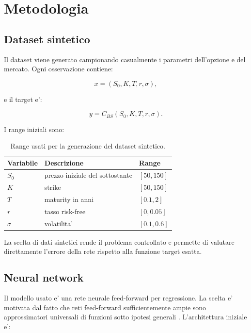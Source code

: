 \section{Metodologia}

\subsection{Dataset sintetico}

Il dataset viene generato campionando casualmente i parametri dell'opzione e del mercato.
Ogni osservazione contiene:

\begin{equation}
    x = (S_0, K, T, r, \sigma),
\end{equation}

e il target e':

\begin{equation}
    y = C_{BS}(S_0, K, T, r, \sigma).
\end{equation}

I range iniziali sono:

\begin{table}[H]
    \centering
    \begin{tabular}{lll}
        \toprule
        Variabile & Descrizione & Range \\
        \midrule
        $S_0$ & prezzo iniziale del sottostante & $[50, 150]$ \\
        $K$ & strike & $[50, 150]$ \\
        $T$ & maturity in anni & $[0.1, 2]$ \\
        $r$ & tasso risk-free & $[0, 0.05]$ \\
        $\sigma$ & volatilita' & $[0.1, 0.6]$ \\
        \bottomrule
    \end{tabular}
    \caption{Range usati per la generazione del dataset sintetico.}
\end{table}

La scelta di dati sintetici rende il problema controllato e permette di valutare direttamente l'errore della rete rispetto alla funzione target esatta.

\subsection{Neural network}

Il modello usato e' una rete neurale feed-forward per regressione.
La scelta e' motivata dal fatto che reti feed-forward sufficientemente ampie sono approssimatori universali di funzioni sotto ipotesi generali \cite{cybenko1989approximation,hornik1989multilayer}.
L'architettura iniziale e':

